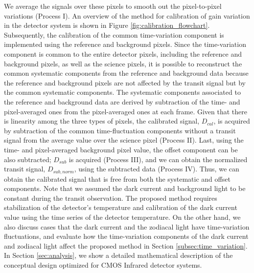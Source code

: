 \documentclass{aastex62}
\begin{document}
We average the signals over these pixels to smooth out the pixel-to-pixel variations (Process I). An overview of the method for calibration of gain variation in the detector system is shown in Figure \ref{fig:calibration_flowchart}. Subsequently, the calibration of the common time-variation component is implemented using the reference and background pixels. Since the time-variation component is common to the entire detector pixels, including the reference and background pixels, as well as the science pixels, it is possible to reconstruct the common systematic components from the reference and background data because the reference and background pixels are not affected by the transit signal but by the common systematic components. The systematic components associated to the reference and background data are derived by subtraction of the time- and pixel-averaged ones from the pixel-averaged ones at each frame. Given that there is linearity among the three types of pixels, the calibrated signal, $D_{cal}$, is acquired by subtraction of the common time-fluctuation components without a transit signal from the average value over the science pixel (Process I\hspace{-.1em}I). Last, using the time- and pixel-averaged background pixel value, the offset component can be also subtracted; $D_{sub}$ is acquired (Process I\hspace{-.1em}I\hspace{-.1em}I), and we can obtain the normalized transit signal, $D_{sub,norm}$, using the subtracted data (Process I\hspace{-.1em}V). Thus, we can obtain the calibrated signal that is free from both the systematic and offset components. Note that we assumed the dark current and background light to be constant during the transit observation. The proposed method requires stabilization of the detector's temperature and calibration of the dark current value using the time series of the detector temperature. On the other hand, we also discuss cases that the dark current and the zodiacal light have time-variation fluctuations, and evaluate how the time-variation components of the dark current and zodiacal light affect the proposed method in Section \ref{subsec:time_variation}. In Section \ref{sec:analysis}, we show a detailed mathematical description of the conceptual design optimized for CMOS Infrared detector systems.
\end{document}
